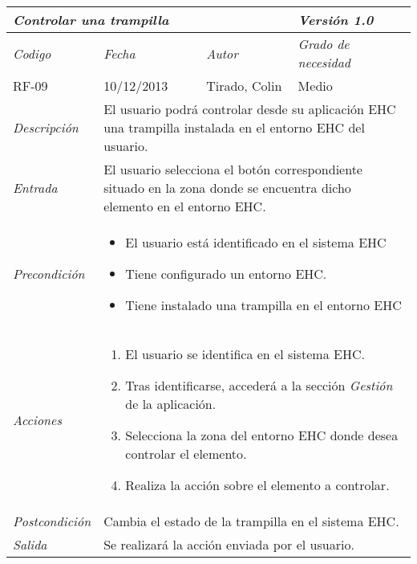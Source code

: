 \begin{center}
    \begin{tabular}{|p{3cm}|p{4cm}|p{4cm}|p{4cm}|}
    \hline \multicolumn{3}{|p{9cm}|}{\textit{Controlar una trampilla}} & \textit{Versi\'on 1.0} \\
    \hline \textit{Codigo} & \textit{Fecha} & \textit{Autor} & \textit{Grado de necesidad} \\
    RF-09 & 10/12/2013 & Tirado, Colin & Medio \\
    \hline \textit{Descripci\'on} & \multicolumn{3}{|p{9cm}|}{El usuario podr\'a controlar desde su aplicaci\'on EHC una trampilla instalada en el entorno EHC del usuario.} \\
    \hline \textit{Entrada} & \multicolumn{3}{|p{9cm}|}{El usuario selecciona el bot\'on correspondiente situado en la zona donde se encuentra dicho elemento en el entorno EHC.} \\
    \hline \textit{Precondici\'on} & \multicolumn{3}{|p{9cm}|}{
    \begin{itemize}
    \item El usuario est\'a identificado en el sistema EHC
    \item Tiene configurado un entorno EHC.
    \item Tiene instalado una trampilla en el entorno EHC
    \end{itemize}
    } \\
    \hline \textit{Acciones} & \multicolumn{3}{|p{9cm}|}{
    \begin{enumerate}
    \item El usuario se identifica en el sistema EHC.
    \item Tras identificarse, acceder\'a a la secci\'on \textit{Gesti\'on} de la aplicaci\'on.
    \item Selecciona la zona del entorno EHC donde desea controlar el elemento.
    \item Realiza la acci\'on sobre el elemento a controlar.
    \end{enumerate}
    } \\
    \hline \textit{Postcondici\'on} & \multicolumn{3}{|p{9cm}|}{Cambia el estado de la trampilla en el sistema EHC.} \\
    \hline \textit{Salida} & \multicolumn{3}{|p{9cm}|}{Se realizar\'a la acci\'on enviada por el usuario.} \\ \hline
    \end{tabular}
\end{center}
